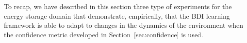 %

\medskip
To recap, we have described in this section three type of experiments for the energy storage domain that demonstrate, empirically, that the BDI learning framework is able to adapt to changes in the dynamics of the environment when the confidence metric developed in Section~\ref{sec:confidence} is used.  



 

